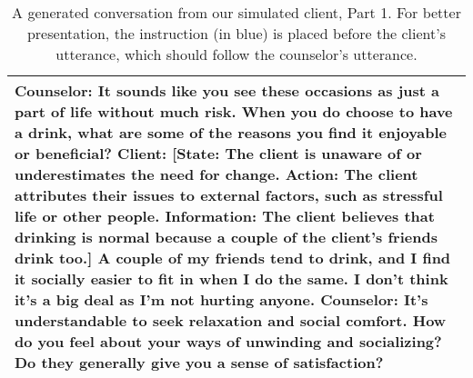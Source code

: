 \begin{table*}[tb]
\begin{tabularx}{\textwidth}{X}
Counselor: It sounds like you see these occasions as just a part of life without much risk. When you do choose to have a drink, what are some of the reasons you find it enjoyable or beneficial?  \newline
Client: {\color{blue} [State: The client is unaware of or underestimates the need for change. Action: The client attributes their issues to external factors, such as stressful life or other people. Information: The client believes that drinking is normal because a couple of the client’s friends drink too.]} A couple of my friends tend to drink, and I find it socially easier to fit in when I do the same. I don't think it's a big deal as I'm not hurting anyone. \newline
Counselor: It's understandable to seek relaxation and social comfort. How do you feel about your ways of unwinding and socializing? Do they generally give you a sense of satisfaction? 
\\ \bottomrule
\end{tabularx}
\caption{A generated conversation from our simulated client, Part 1. For better presentation, the instruction (in {\color{blue} blue}) is placed before the client's utterance, which should follow the counselor's utterance.}
\label{tab:our conv}
\end{table*}


